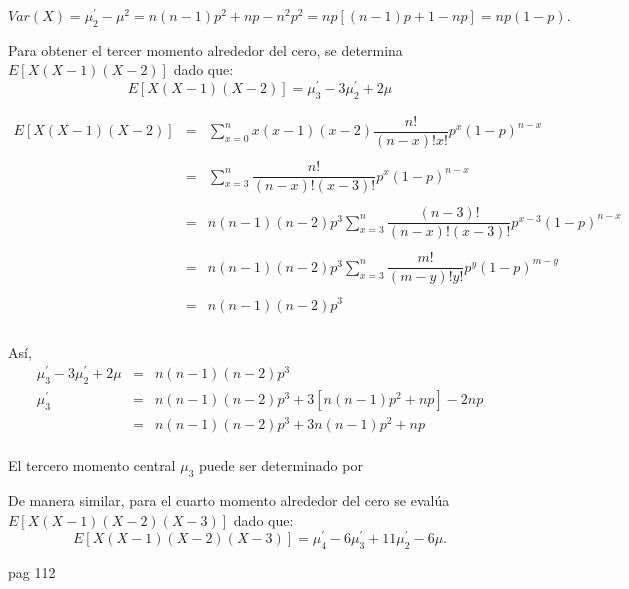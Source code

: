 \begin{tcolorbox}[colback=white]
    $$Var(X) = \mu_2^{'}-\mu^2 = n(n-1)p^2 + np - n^2p^2 = np[(n-1)p+1-np] = np(1-p).$$
\end{tcolorbox}

\vspace{1cm}

Para obtener el tercer momento alrededor del cero, se determina $E[X(X-1)(X-2)]$ dado que:
$$E[X(X-1)(X-2)]=\mu_3^{'} - 3\mu_2^{'} + 2\mu$$

$$\begin{array}{rcl}
    E[X(X-1)(X-2)]&=&\sum\limits_{x=0}^n x(x-1)(x-2)\dfrac{n!}{(n-x)!x!} p^x(1-p)^{n-x}\\\\
		  &=&\sum\limits_{x=3}^n \dfrac{n!}{(n-x)!(x-3)!}p^x(1-p)^{n-x}\\\\
		  &=&n(n-1)(n-2)p^3 \sum_{x=3}^n \dfrac{(n-3)!}{(n-x)!(x-3)!}p^{x-3}(1-p)^{n-x}\\\\
		  &=&n(n-1)(n-2)p^3 \sum_{x=3}^n \dfrac{m!}{(m-y)!y!}p^{y}(1-p)^{m-y}\\\\
		  &=&n(n-1)(n-2)p^3\\\\
\end{array}$$

Así,
$$\begin{array}{rcl}
    \mu_3^{'}-3\mu_2^{'}+2\mu&=&n(n-1)(n-2)p^3\\
    \mu_3^{'}&=&n(n-1)(n-2)p^3+3[n(n-1)p^2+np]-2np\\
	     &=&n(n-1)(n-2)p^3+3n(n-1)p^2+np\\
\end{array}$$

El tercero momento central $\mu_3$ puede ser determinado por 








De manera similar, para el cuarto momento alrededor del cero se evalúa $E[X(X-1)(X-2)(X-3)]$ dado que:
$$E[X(X-1)(X-2)(X-3)] = \mu_4^{'}-6\mu_3^{'}+11\mu_2^{'}-6\mu.$$

pag 112
